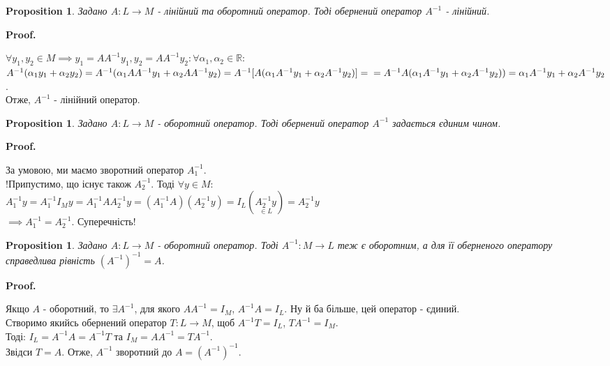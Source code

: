 \documentclass[a4paper, 10pt]{article}
\makeatletter
\theoremstyle{theoremdd}
\newtheorem{proposition}[theorem]{Proposition}
\renewenvironment{proof}[1][Proof.\\]{\par
\pushQED{\hfill \qed}%
\normalfont \topsep6\p@\@plus6\p@\relax
\trivlist
\item\relax
{\bfseries
#1\@addpunct{.}}\hspace\labelsep\ignorespaces
}{%
\popQED\endtrivlist\@endpefalse
}
\makeatother
\begin{document}
	\begin{proposition}
	Задано $A: L \to M$ - лінійний та оборотний оператор. Тоді обернений оператор $A^{-1}$ - лінійний.
	\end{proposition}
	
	\begin{proof}
	$\forall y_1, y_2 \in M \implies y_1 = AA^{-1}y_1, y_2 = AA^{-1}y_2: \forall \alpha_1, \alpha_2 \in \mathbb{R}:$\\
	$A^{-1}(\alpha_1 y_1 + \alpha_2 y_2) = A^{-1}(\alpha_1 AA^{-1}y_1 + \alpha_2 AA^{-1}y_2) = A^{-1}[A(\alpha_1 A^{-1}y_1 + \alpha_2 A^{-1}y_2)] = \\ = A^{-1}A(\alpha_1 A^{-1}y_1 + \alpha_2 A^{-1}y_2)) = \alpha_1 A^{-1}y_1 + \alpha_2 A^{-1}y_2$.\\
	Отже, $A^{-1}$ - лінійний оператор.
	\end{proof}
	
	\begin{proposition}
	Задано $A: L \to M$ - оборотний оператор. Тоді обернений оператор $A^{-1}$ задається єдиним чином.
	\end{proposition}
	
	\begin{proof}
	За умовою, ми маємо зворотний оператор $A_1^{-1}$.\\
	!Припустимо, що існує також $A^{-1}_2$. Тоді $\forall y \in M:$\\
	$A^{-1}_1 y = A^{-1}_1 I_M y = A^{-1}_1 A A^{-1}_2 y = (A^{-1}_1 A) (A^{-1}_2 y) = I_L (\underset{\in L}{A^{-1}_2 y}) = A_2^{-1}y$\\
	$\implies A^{-1}_1 = A^{-1}_2$. Суперечність!
	\end{proof}
	
	\begin{proposition}
	Задано $A: L \to M$ - оборотний оператор. Тоді $A^{-1}: M \to L$ теж є оборотним, а для її оберненого оператору справедлива рівність $(A^{-1})^{-1} = A$.
	\end{proposition}
	
	\begin{proof}
	Якщо $A$ - оборотний, то $\exists A^{-1}$, для якого $AA^{-1} = I_M$, $A^{-1}A = I_L$. Ну й ба більше, цей оператор - єдиний.\\
	Створимо якийсь обернений оператор $T: L \to M$, щоб $A^{-1}T = I_L$, $TA^{-1} = I_M$.\\
	Тоді: $I_L = A^{-1}A = A^{-1}T$ та $I_M = AA^{-1} = TA^{-1}$.\\
	Звідси $T = A$. Отже, $A^{-1}$ зворотний до $A = (A^{-1})^{-1}$.
	\end{proof}
	
\end{document}
